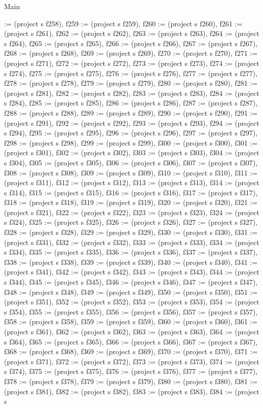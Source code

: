 \begin{lexlean}{Main}
\begin{semanticmodule}
{:= (project s f258), f259 := (project s f259), f260 := (project s f260), f261 := (project s f261), f262 := (project s f262), f263 := (project s f263), f264 := (project s f264), f265 := (project s f265), f266 := (project s f266), f267 := (project s f267), f268 := (project s f268), f269 := (project s f269), f270 := (project s f270), f271 := (project s f271), f272 := (project s f272), f273 := (project s f273), f274 := (project s f274), f275 := (project s f275), f276 := (project s f276), f277 := (project s f277), f278 := (project s f278), f279 := (project s f279), f280 := (project s f280), f281 := (project s f281), f282 := (project s f282), f283 := (project s f283), f284 := (project s f284), f285 := (project s f285), f286 := (project s f286), f287 := (project s f287), f288 := (project s f288), f289 := (project s f289), f290 := (project s f290), f291 := (project s f291), f292 := (project s f292), f293 := (project s f293), f294 := (project s f294), f295 := (project s f295), f296 := (project s f296), f297 := (project s f297), f298 := (project s f298), f299 := (project s f299), f300 := (project s f300), f301 := (project s f301), f302 := (project s f302), f303 := (project s f303), f304 := (project s f304), f305 := (project s f305), f306 := (project s f306), f307 := (project s f307), f308 := (project s f308), f309 := (project s f309), f310 := (project s f310), f311 := (project s f311), f312 := (project s f312), f313 := (project s f313), f314 := (project s f314), f315 := (project s f315), f316 := (project s f316), f317 := (project s f317), f318 := (project s f318), f319 := (project s f319), f320 := (project s f320), f321 := (project s f321), f322 := (project s f322), f323 := (project s f323), f324 := (project s f324), f325 := (project s f325), f326 := (project s f326), f327 := (project s f327), f328 := (project s f328), f329 := (project s f329), f330 := (project s f330), f331 := (project s f331), f332 := (project s f332), f333 := (project s f333), f334 := (project s f334), f335 := (project s f335), f336 := (project s f336), f337 := (project s f337), f338 := (project s f338), f339 := (project s f339), f340 := (project s f340), f341 := (project s f341), f342 := (project s f342), f343 := (project s f343), f344 := (project s f344), f345 := (project s f345), f346 := (project s f346), f347 := (project s f347), f348 := (project s f348), f349 := (project s f349), f350 := (project s f350), f351 := (project s f351), f352 := (project s f352), f353 := (project s f353), f354 := (project s f354), f355 := (project s f355), f356 := (project s f356), f357 := (project s f357), f358 := (project s f358), f359 := (project s f359), f360 := (project s f360), f361 := (project s f361), f362 := (project s f362), f363 := (project s f363), f364 := (project s f364), f365 := (project s f365), f366 := (project s f366), f367 := (project s f367), f368 := (project s f368), f369 := (project s f369), f370 := (project s f370), f371 := (project s f371), f372 := (project s f372), f373 := (project s f373), f374 := (project s f374), f375 := (project s f375), f376 := (project s f376), f377 := (project s f377), f378 := (project s f378), f379 := (project s f379), f380 := (project s f380), f381 := (project s f381), f382 := (project s f382), f383 := (project s f383), f384 := (project s }
\end{semanticmodule}
\end{lexlean}
